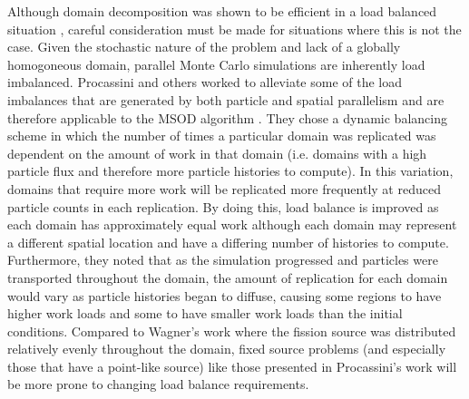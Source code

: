 Although domain decomposition was shown to be efficient in a load
balanced situation \citep{siegel_analysis_2012}, careful consideration
must be made for situations where this is not the case. Given the
stochastic nature of the problem and lack of a globally homogoneous
domain, parallel Monte Carlo simulations are inherently load
imbalanced. Procassini and others worked to alleviate some of the load
imbalances that are generated by both particle and spatial parallelism
and are therefore applicable to the MSOD algorithm
\citep{procassini_dynamic_2005}. They chose a dynamic balancing scheme
in which the number of times a particular domain was replicated was
dependent on the amount of work in that domain (i.e. domains with a
high particle flux and therefore more particle histories to
compute). In this variation, domains that require more work will be
replicated more frequently at reduced particle counts in each
replication. By doing this, load balance is improved as each domain
has approximately equal work although each domain may represent a
different spatial location and have a differing number of histories to
compute. Furthermore, they noted that as the simulation progressed and
particles were transported throughout the domain, the amount of
replication for each domain would vary as particle histories began to
diffuse, causing some regions to have higher work loads and some to
have smaller work loads than the initial conditions. Compared to
Wagner's work where the fission source was distributed relatively
evenly throughout the domain, fixed source problems (and especially
those that have a point-like source) like those presented in
Procassini's work will be more prone to changing load balance
requirements.

